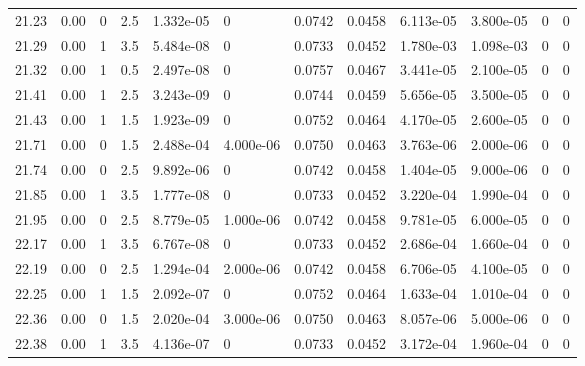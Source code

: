 \documentclass[preview]{standalone}
\begin{document}
{{{{{{{\begin{tabular}{L{1.2cm}C{1.2cm} C{0.3cm}C{0.5cm} C{1.4cm}C{1.4cm} C{1.4cm}C{1.4cm} C{1.6cm}C{1.6cm} C{1.6cm}C{1.6cm}}
  21.23  &  0.00  & 0     & 2.5 &  1.332e-05  & 0  &  0.0742&   0.0458& 6.113e-05 & 3.800e-05   &  0 & 0  \\ 
  21.29  &  0.00  & 1     & 3.5 &  5.484e-08  & 0  &  0.0733&   0.0452& 1.780e-03 & 1.098e-03   &  0 & 0  \\ 
  21.32  &  0.00  & 1     & 0.5 &  2.497e-08  & 0  &  0.0757&   0.0467& 3.441e-05 & 2.100e-05   &  0 & 0  \\ 
  21.41  &  0.00  & 1     & 2.5 &  3.243e-09  & 0  &  0.0744&   0.0459& 5.656e-05 & 3.500e-05   &  0 & 0  \\ 
  21.43  &  0.00  & 1     & 1.5 &  1.923e-09  & 0  &  0.0752&   0.0464& 4.170e-05 & 2.600e-05   &  0 & 0  \\ 
  21.71  &  0.00  & 0     & 1.5 &  2.488e-04  & 4.000e-06  &  0.0750&   0.0463& 3.763e-06 & 2.000e-06   &  0 & 0  \\ 
  21.74  &  0.00  & 0     & 2.5 &  9.892e-06  & 0  &  0.0742&   0.0458& 1.404e-05 & 9.000e-06   &  0 & 0  \\ 
  21.85  &  0.00  & 1     & 3.5 &  1.777e-08  & 0  &  0.0733&   0.0452& 3.220e-04 & 1.990e-04   &  0 & 0  \\ 
  21.95  &  0.00  & 0     & 2.5 &  8.779e-05  & 1.000e-06  &  0.0742&   0.0458& 9.781e-05 & 6.000e-05   &  0 & 0  \\ 
  22.17  &  0.00  & 1     & 3.5 &  6.767e-08  & 0  &  0.0733&   0.0452& 2.686e-04 & 1.660e-04   &  0 & 0  \\ 
  22.19  &  0.00  & 0     & 2.5 &  1.294e-04  & 2.000e-06  &  0.0742&   0.0458& 6.706e-05 & 4.100e-05   &  0 & 0  \\ 
  22.25  &  0.00  & 1     & 1.5 &  2.092e-07  & 0  &  0.0752&   0.0464& 1.633e-04 & 1.010e-04   &  0 & 0  \\ 
  22.36  &  0.00  & 0     & 1.5 &  2.020e-04  & 3.000e-06  &  0.0750&   0.0463& 8.057e-06 & 5.000e-06   &  0 & 0  \\ 
  22.38  &  0.00  & 1     & 3.5 &  4.136e-07  & 0  &  0.0733&   0.0452& 3.172e-04 & 1.960e-04   &  0 & 0  \\ 
\hline 
\end{tabular} 

}}}}}}}
\end{document}
